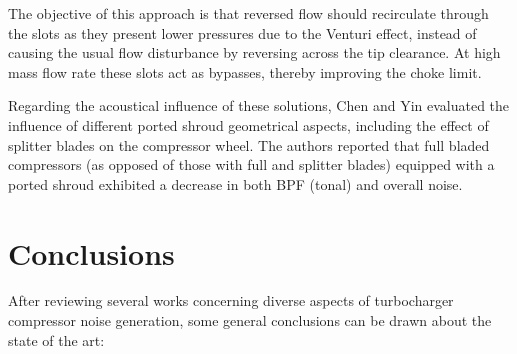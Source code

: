 The objective of this approach is that reversed flow should recirculate through the slots as they present lower pressures due to the Venturi effect, instead of causing the usual flow disturbance by reversing across the tip clearance. At high mass flow rate these slots act as bypasses, thereby improving the choke limit. 

Regarding the acoustical influence of these solutions, Chen and Yin \cite{chen2006turboc} evaluated the influence of different ported shroud geometrical aspects, including the effect of splitter blades on the compressor wheel. The authors reported that full bladed compressors (as opposed of those with full and splitter blades) equipped with a ported shroud exhibited a decrease in both BPF (tonal) and overall noise.

\section{Conclusions}

After reviewing several works concerning diverse aspects of turbocharger compressor noise generation, some general conclusions can be drawn about the state of the art:

